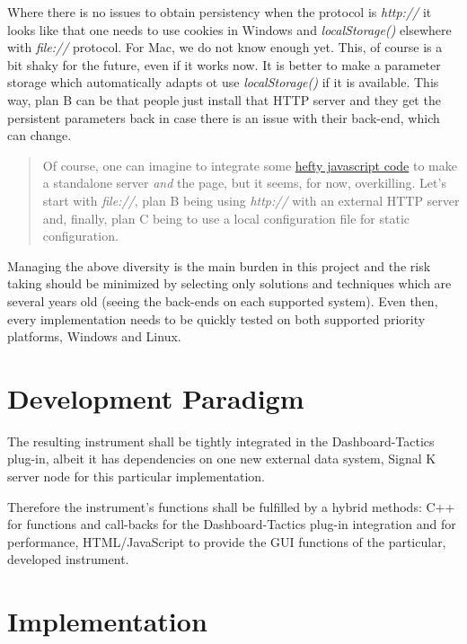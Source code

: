 \documentclass[11pt]{article}
\begin{document}
Where there is no issues to obtain persistency when the protocol is
\emph{http://} it looks like that one needs to use cookies in Windows
and \emph{localStorage()} elsewhere with \emph{file://} protocol. For
Mac, we do not know enough yet. This, of course is a bit shaky for the
future, even if it works now. It is better to make a parameter storage
which automatically adapts ot use \emph{localStorage()} if it is
available. This way, plan B can be that people just install that HTTP
server and they get the persistent parameters back in case there is an
issue with their back-end, which can change.

\begin{quote}
Of course, one can imagine to integrate some
\href{https://dev.to/rumkin/how-to-create-js-webserver-without-node-js-1hic}{hefty
javascript code} to make a standalone server \emph{and} the page, but it
seems, for now, overkilling. Let's start with \emph{file://}, plan B
being using \emph{http://} with an external HTTP server and, finally,
plan C being to use a local configuration file for static configuration.
\end{quote}

    Managing the above diversity is the main burden in this project and the
risk taking should be minimized by selecting only solutions and
techniques which are several years old (seeing the back-ends on each
supported system). Even then, every implementation needs to be quickly
tested on both supported priority platforms, Windows and Linux.

    \hypertarget{development-paradigm}{%
\section{Development Paradigm}\label{development-paradigm}}

    The resulting instrument shall be tightly integrated in the
Dashboard-Tactics plug-in, albeit it has dependencies on one new
external data system, Signal K server node for this particular
implementation.

    Therefore the instrument's functions shall be fulfilled by a hybrid
methods: C++ for functions and call-backs for the Dashboard-Tactics
plug-in integration and for performance, HTML/JavaScript to provide the
GUI functions of the particular, developed instrument.

    \hypertarget{implementation}{%
\section{Implementation}\label{implementation}}
\end{document}
